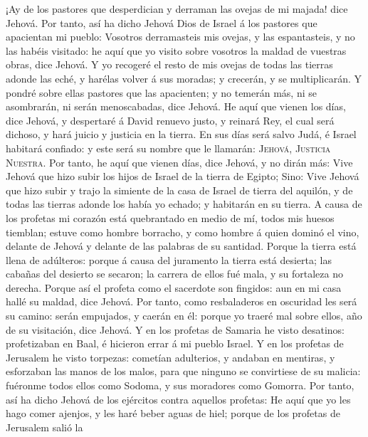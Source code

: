  ¡Ay de los pastores que desperdician y derraman las
ovejas de mi majada! dice Jehová.  Por tanto, así ha dicho
Jehová Dios de Israel á los pastores que apacientan mi pueblo: Vosotros
derramasteis mis ovejas, y las espantasteis, y no las habéis visitado:
he aquí que yo visito sobre vosotros la maldad de vuestras obras, dice
Jehová.  Y yo recogeré el resto de mis ovejas de todas las
tierras adonde las eché, y harélas volver á sus moradas; y crecerán, y
se multiplicarán.  Y pondré sobre ellas pastores que las
apacienten; y no temerán más, ni se asombrarán, ni serán menoscabadas,
dice Jehová.  He aquí que vienen los días, dice Jehová, y
despertaré á David renuevo justo, y reinará Rey, el cual será dichoso, y
hará juicio y justicia en la tierra.  En sus días será
salvo Judá, é Israel habitará confiado: y este será su nombre que le
llamarán: \textsc{Jehová}, \textsc{Justicia} \textsc{Nuestra}.
 Por tanto, he aquí que vienen días, dice Jehová, y no
dirán más: Vive Jehová que hizo subir los hijos de Israel de la tierra
de Egipto;  Sino: Vive Jehová que hizo subir y trajo la
simiente de la casa de Israel de tierra del aquilón, y de todas las
tierras adonde los había yo echado; y habitarán en su tierra.
 A causa de los profetas mi corazón está quebrantado en
medio de mí, todos mis huesos tiemblan; estuve como hombre borracho, y
como hombre á quien dominó el vino, delante de Jehová y delante de las
palabras de su santidad.  Porque la tierra está llena de
adúlteros: porque á causa del juramento la tierra está desierta; las
cabañas del desierto se secaron; la carrera de ellos fué mala, y su
fortaleza no derecha.  Porque así el profeta como el
sacerdote son fingidos: aun en mi casa hallé su maldad, dice Jehová.
 Por tanto, como resbaladeros en oscuridad les será su
camino: serán empujados, y caerán en él: porque yo traeré mal sobre
ellos, año de su visitación, dice Jehová.  Y en los
profetas de Samaria he visto desatinos: profetizaban en Baal, é hicieron
errar á mi pueblo Israel.  Y en los profetas de Jerusalem
he visto torpezas: cometían adulterios, y andaban en mentiras, y
esforzaban las manos de los malos, para que ninguno se convirtiese de su
malicia: fuéronme todos ellos como Sodoma, y sus moradores como Gomorra.
 Por tanto, así ha dicho Jehová de los ejércitos contra
aquellos profetas: He aquí que yo les hago comer ajenjos, y les haré
beber aguas de hiel; porque de los profetas de Jerusalem salió la
